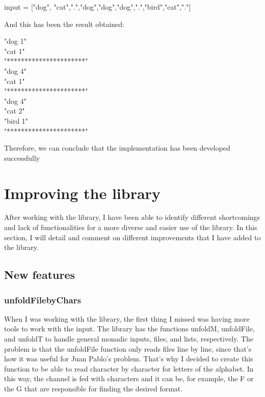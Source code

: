 \begin{center}
input = ["dog", "cat",".","dog","dog","dog",".","bird","cat","."]
\end{center}
And this has been the result obtained:

\begin{center}
"dog 1" \\
"cat 1" \\
"**********************" \\
"dog 4" \\
"cat 1" \\
"**********************" \\
"dog 4" \\
"cat 2" \\
"bird 1" \\
"**********************" \\
\end{center}

Therefore, we can conclude that the implementation has been developed successfully
\section{Improving the library}
After working with the library, I have been able to identify different shortcomings and lack of functionalities for a more diverse and easier use of the library.
In this section, I will detail and comment on different improvements that I have added to the library.

\subsection{New features}
\subsubsection*{unfoldFilebyChars}

When I was working with the library, the first thing I missed was having more tools to work with the input.
The library has the functions unfoldM, unfoldFile, and unfoldT to handle general monadic inputs, files, and lists, respectively.
The problem is that the unfoldFile function only reads files line by line, since that's how it was useful for Juan Pablo's problem.
That's why I decided to create this function to be able to read character by character for letters of the alphabet.
In this way, the channel is fed with characters and it can be, for example, the F or the G that are responsible for finding the desired format.

